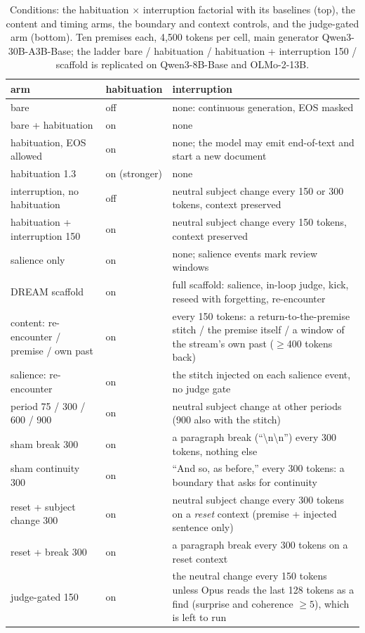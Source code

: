 \begin{table}[t]
\centering\small
\begin{tabular}{@{}llp{7.4cm}@{}}
\toprule
arm & habituation & interruption \\
\midrule
bare & off & none: continuous generation, EOS masked \\
bare + habituation & on & none \\
habituation, EOS allowed & on & none; the model may emit end-of-text and start a new document \\
habituation 1.3 & on (stronger) & none \\
interruption, no habituation & off & neutral subject change every 150 or 300 tokens, context preserved \\
habituation + interruption 150 & on & neutral subject change every 150 tokens, context preserved \\
salience only & on & none; salience events mark review windows \\
DREAM scaffold & on & full scaffold: salience, in-loop judge, kick, reseed with forgetting, re-encounter \\
\midrule
content: re-encounter / premise / own past & on & every 150 tokens: a return-to-the-premise stitch / the premise itself / a window of the stream's own past ($\ge$400 tokens back) \\
salience: re-encounter & on & the stitch injected on each salience event, no judge gate \\
period 75 / 300 / 600 / 900 & on & neutral subject change at other periods (900 also with the stitch) \\
\midrule
sham break 300 & on & a paragraph break (``\textbackslash n\textbackslash n'') every 300 tokens, nothing else \\
sham continuity 300 & on & ``And so, as before,'' every 300 tokens: a boundary that asks for continuity \\
reset + subject change 300 & on & neutral subject change every 300 tokens on a \emph{reset} context (premise + injected sentence only) \\
reset + break 300 & on & a paragraph break every 300 tokens on a reset context \\
\midrule
judge-gated 150 & on & the neutral change every 150 tokens unless Opus reads the last 128 tokens as a find (surprise and coherence $\ge5$), which is left to run \\
\bottomrule
\end{tabular}
\caption{Conditions: the habituation $\times$ interruption factorial with its
baselines (top), the content and timing arms, the boundary and context
controls, and the judge-gated arm (bottom). Ten premises each, 4,500 tokens per cell, main
generator Qwen3-30B-A3B-Base; the ladder bare / habituation / habituation +
interruption 150 / scaffold is replicated on Qwen3-8B-Base and OLMo-2-13B.}
\label{tab:conditions}
\end{table}

